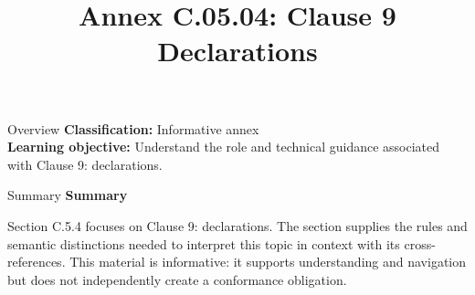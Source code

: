 \documentclass[10pt,letterpaper]{article}
\title{Annex C.05.04: Clause 9 Declarations}
\author{}
\date{}
\begin{document}
\maketitle
\begin{CornellOverviewBox}{Overview}
\textbf{Classification:} Informative annex\\[2pt]
\textbf{Learning objective:} Understand the role and technical guidance associated with Clause 9: declarations.
\end{CornellOverviewBox}\begin{CornellSummaryBox}{Summary}
{\sffamily\bfseries\color{Accent} Summary}\par\vspace{3pt}Section C.5.4 focuses on Clause 9: declarations. The section supplies the rules and semantic distinctions needed to interpret this topic in context with its cross-references. This material is informative: it supports understanding and navigation but does not independently create a conformance obligation.
\end{CornellSummaryBox}
\end{document}
